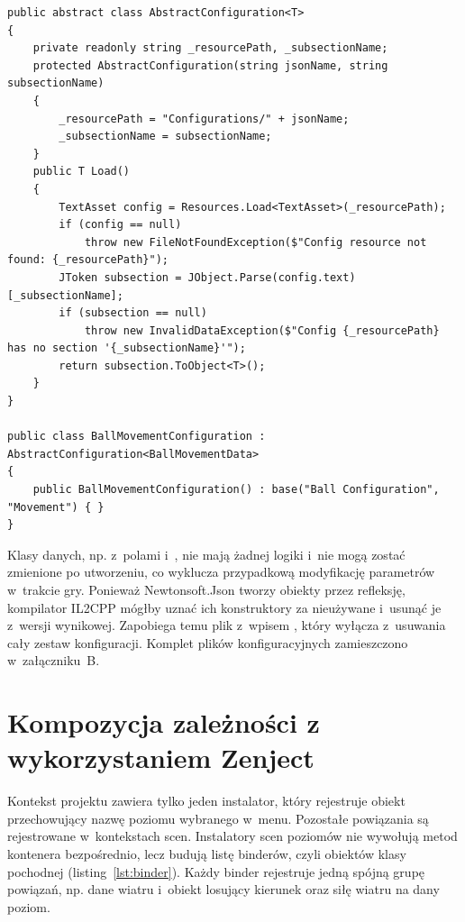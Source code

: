 \begin{lstlisting}[caption={Generyczna klasa wczytująca sekcję pliku konfiguracyjnego; \zrodloWlasne},label=lst:konfiguracja]
public abstract class AbstractConfiguration<T>
{
    private readonly string _resourcePath, _subsectionName;
    protected AbstractConfiguration(string jsonName, string subsectionName)
    {
        _resourcePath = "Configurations/" + jsonName;
        _subsectionName = subsectionName;
    }
    public T Load()
    {
        TextAsset config = Resources.Load<TextAsset>(_resourcePath);
        if (config == null)
            throw new FileNotFoundException($"Config resource not found: {_resourcePath}");
        JToken subsection = JObject.Parse(config.text)[_subsectionName];
        if (subsection == null)
            throw new InvalidDataException($"Config {_resourcePath} has no section '{_subsectionName}'");
        return subsection.ToObject<T>();
    }
}

public class BallMovementConfiguration : AbstractConfiguration<BallMovementData>
{
    public BallMovementConfiguration() : base("Ball Configuration", "Movement") { }
}
\end{lstlisting}

Klasy danych, np.  z~polami 
i~, nie mają żadnej logiki i~nie mogą zostać zmienione po
utworzeniu, co wyklucza przypadkową modyfikację parametrów w~trakcie gry. Ponieważ
Newtonsoft.Json tworzy obiekty przez refleksję, kompilator IL2CPP mógłby uznać ich
konstruktory za nieużywane i~usunąć je z~wersji wynikowej. Zapobiega temu plik
 z~wpisem ,
który wyłącza z~usuwania cały zestaw konfiguracji. Komplet plików konfiguracyjnych
zamieszczono w~załączniku~B.

\section{Kompozycja zależności z wykorzystaniem Zenject}
\label{sec:kompozycja}

Kontekst projektu zawiera tylko jeden instalator, który rejestruje obiekt
 przechowujący nazwę poziomu wybranego w~menu. Pozostałe powiązania są
rejestrowane w~kontekstach scen. Instalatory scen poziomów nie wywołują metod kontenera
bezpośrednio, lecz budują listę binderów, czyli obiektów klasy pochodnej
 (listing~\ref{lst:binder}). Każdy binder rejestruje jedną spójną grupę
powiązań, np. dane wiatru i~obiekt  losujący kierunek oraz siłę wiatru
na dany poziom.

